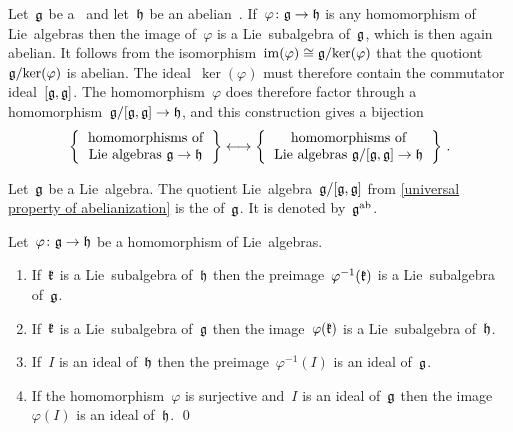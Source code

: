 \begin{example}
  \label{universal property of abelianization}
  Let~$\mathfrak{g}$ be a~\liealgebra{$\kf$} and let~$\mathfrak{h}$ be an abelian~\liealgebra{$\kf$}.
  If~$\varphi \colon \glie \to \hlie$ is any homomorphism of Lie~algebras then the image of~$\varphi$ is a Lie~subalgebra of~$\mathfrak{g}$, which is then again abelian.
  It follows from the isomorphism~$\operatorname{im}(\varphi) \cong \mathfrak{g} / {\ker(\varphi)}$ that the quotiont~$\mathfrak{g} / {\ker(\varphi)}$ is abelian.
  The ideal~$\ker(\varphi)$ must therefore contain the commutator ideal~$[\mathfrak{g}, \mathfrak{g}]$.
  The homomorphism~$\varphi$ does therefore factor through a homomorphism~$\glie / [\glie, \glie] \to \hlie$, and this construction gives a bijection
  \[
    \left\{
      \begin{tabular}{c}
        homomorphisms of \\
        Lie~algebras~$\glie \to \hlie$
      \end{tabular}
    \right\}
    \onetoone
    \left\{
      \begin{tabular}{c}
        homomorphisms of \\
        Lie~algebras $\glie/[\glie, \glie] \to \hlie$
      \end{tabular}
    \right\} \,.
  \]
\end{example}


\begin{definition}
  Let~$\mathfrak{g}$ be a Lie~algebra.
  The quotient Lie~algebra~$\mathfrak{g} / [\mathfrak{g}, \mathfrak{g}]$ from \cref{universal property of abelianization} is the  of~$\mathfrak{g}$.
  It is denoted by~$\mathfrak{g}^{\mathrm{ab}}$.
\end{definition}




\begin{lemma}
  Let~$\varphi \colon \glie \to \hlie$ be a homomorphism of Lie~algebras.
  \begin{enumerate}
    \item
      If~$\mathfrak{k}$ is a Lie~subalgebra of~$\mathfrak{h}$ then the preimage~$\varphi^{-1}(\mathfrak{k})$ is a Lie~subalgebra of~$\mathfrak{g}$.
    \item
      If~$\mathfrak{k}$ is a Lie~subalgebra of~$\mathfrak{g}$ then the image~$\varphi(\mathfrak{k})$ is a Lie~subalgebra of~$\mathfrak{h}$.
    \item
      If~$I$ is an ideal of~$\mathfrak{h}$ then the preimage~$\varphi^{-1}(I)$ is an ideal of~$\mathfrak{g}$.
    \item
      If the homomorphism~$\varphi$ is surjective and~$I$ is an ideal of~$\mathfrak{g}$ then the image~$\varphi(I)$ is an ideal of~$\mathfrak{h}$.
    \qed
  \end{enumerate}
\end{lemma}


